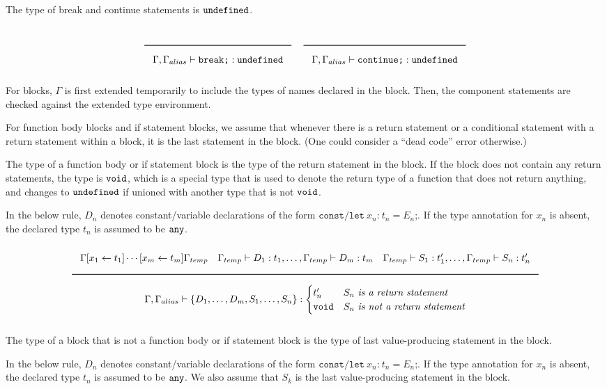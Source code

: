 The type of break and continue statements is $\texttt{undefined}$.

\noindent
\[
  \Rule{}{\Gamma, \Gamma_{alias} \vdash \texttt{break} \texttt{;} : \Undefined}
  \quad
  \Rule{}{\Gamma, \Gamma_{alias} \vdash \texttt{continue} \texttt{;} : \Undefined}
\]
\noindent

For blocks, $\Gamma$ is first extended temporarily to include the types of names declared in the block.
Then, the component statements are checked against the extended type environment.

For function body blocks and if statement blocks, we assume that whenever there is a return statement
or a conditional statement with a return statement within a block, it is the last statement in the block.
(One could consider a ``dead code'' error otherwise.)

The type of a function body or if statement block is the type of the return statement in the block.
If the block does not contain any return statements, the type is $\texttt{void}$,
which is a special type that is used to denote the return type of a function that does not return anything,
and changes to $\texttt{undefined}$ if unioned with another type that is not $\texttt{void}$.

In the below rule, $D_n$ denotes constant/variable declarations of the form $\texttt{const/let}\ x_n \texttt{:}\ t_n = E_n\texttt{;}$.
If the type annotation for $x_n$ is absent, the declared type $t_n$ is assumed to be $\texttt{any}$.

\noindent
\[
  \Rule{\Gamma [x_1 \leftarrow t_1] \cdots [x_m \leftarrow t_m] \Gamma_{temp} \quad
    \Gamma_{temp} \vdash D_1 : t_1, \ldots, \Gamma_{temp} \vdash D_m : t_m \quad
    \Gamma_{temp} \vdash S_1 : t'_1, \ldots, \Gamma_{temp} \vdash S_n : t'_n
    }{\Gamma, \Gamma_{alias} \vdash \{ D_1, \ldots, D_m, S_1, \ldots, S_n\} : 
      \begin{cases}
        t'_n & S_n\ \textit{is a return statement} \\
        \Void & S_n\ \textit{is not a return statement}
      \end{cases}
    }
\]
\noindent

The type of a block that is not a function body or if statement block is the type of last value-producing statement in the block.

In the below rule, $D_n$ denotes constant/variable declarations of the form $\texttt{const/let}\ x_n \texttt{:}\ t_n = E_n\texttt{;}$.
If the type annotation for $x_n$ is absent, the declared type $t_n$ is assumed to be $\texttt{any}$.
We also assume that $S_k$ is the last value-producing statement in the block.

